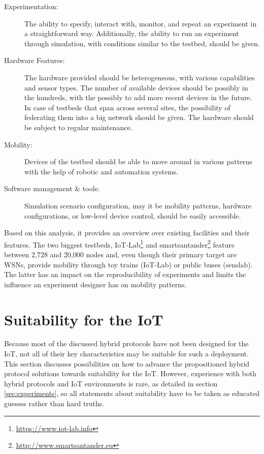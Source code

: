 \documentclass[a4paper,10pt]{scrartcl}
\begin{document}
\begin{description}
\item[Experimentation:] The ability to specify, interact with, monitor, and repeat an experiment in a straightforward way. Additionally, the ability to run an experiment through simulation, with conditions similar to the testbed, should be given.
\item[Hardware Features:] The hardware provided should be heterogeneous, with various capabilities and sensor types. The number of available devices should be possibly in the hundreds, with the possibly to add more recent devices in the future. In case of testbeds that span across several sites, the possibility of federating them into a big network should be given. The hardware should be subject to regular maintenance.
\item[Mobility:] Devices of the testbed should be able to move around in various patterns with the help of robotic and automation systems.
\item[Software management \& tools:] Simulation scenario configuration, may it be mobility patterns, hardware configurations, or low-level device control, should be easily accessible.
\end{description}
Based on this analysis, it provides an overview over existing facilities and their features. The two biggest testbeds, IoT-Lab\footnote{\url{https://www.iot-lab.info}} and smartsantander\footnote{\url{http://www.smartsantander.eu}} feature between 2,728 and 20,000 nodes and, even though their primary target are \glspl{WSN}, provide mobility through toy trains (IoT-Lab) or public buses (senslab). The latter has an impact on the reproducibility of experiments and limits the influence an experiment designer has on mobility patterns.

\section{Suitability for the IoT}
\label{sec:suitability}

Because most of the discussed hybrid protocols have not been designed for the IoT, not all of their key characteristics may be suitable for such a deployment. This section discusses possibilities on how to advance the propositioned hybrid protocol solutions towards suitability for the IoT. However, experience with both hybrid protocols and IoT environments is rare, as detailed in section \ref{sec:experiments}, so all statements about suitability have to be taken as educated guesses rather than hard truths.\\
\end{document}
